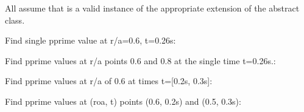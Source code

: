 \documentclass[letterpaper,10pt,english]{sphinxmanual}
\begin{document}
\begin{fulllineitems}
\begin{fulllineitems}
All assume that  is a valid instance of the appropriate
extension of the {\hyperref[\detokenize{eqtools:eqtools.core.Equilibrium}]{}} abstract class.

Find single pprime value at r/a=0.6, t=0.26s:

\begin{sphinxVerbatim}[commandchars=\\\{\}]
   
\end{sphinxVerbatim}

Find pprime values at r/a points 0.6 and 0.8 at the
single time t=0.26s.:

\begin{sphinxVerbatim}[commandchars=\\\{\}]
  \PYG{p}{[} \PYG{p}{]} 
\end{sphinxVerbatim}

Find pprime values at r/a of 0.6 at times t={[}0.2s, 0.3s{]}:

\begin{sphinxVerbatim}[commandchars=\\\{\}]
   \PYG{p}{[} \PYG{p}{]}
\end{sphinxVerbatim}

Find pprime values at (roa, t) points (0.6, 0.2s) and (0.5, 0.3s):

\begin{sphinxVerbatim}[commandchars=\\\{\}]
  \PYG{p}{[} \PYG{p}{]} \PYG{p}{[} \PYG{p}{]} 
\end{sphinxVerbatim}

\end{fulllineitems}



\end{fulllineitems}
\end{document}
